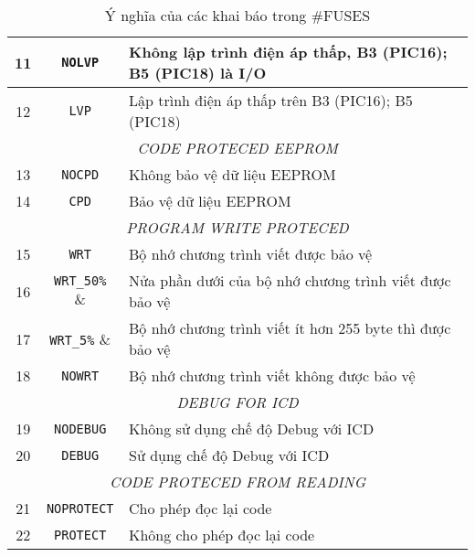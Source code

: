 \begin{table}[!h]
\begin{center}
\begin{longtable}{|c|c|c|c|}
11 & \verb|NOLVP| & \multicolumn{2}{|l|}{Không lập trình điện áp thấp, B3 (PIC16); B5 (PIC18) là I/O} \\ \hline
12 & \verb|LVP| & \multicolumn{2}{|l|}{Lập trình điện áp thấp trên B3 (PIC16); B5 (PIC18)} \\ \hline
\multicolumn{4}{|c|}{\textit{CODE PROTECED EEPROM}}\\ \hline
13 & \verb|NOCPD| & \multicolumn{2}{|l|}{Không bảo vệ dữ liệu EEPROM} \\ \hline
14 & \verb|CPD| & \multicolumn{2}{|l|}{Bảo vệ dữ liệu EEPROM} \\ \hline
\multicolumn{4}{|c|}{\textit{PROGRAM WRITE PROTECED}}\\ \hline
15 & \verb|WRT| & \multicolumn{2}{|l|}{Bộ nhớ chương trình viết được bảo vệ} \\ \hline
16 & \verb|WRT_50%| & \multicolumn{2}{|l|}{Nửa phần dưới của bộ nhớ chương trình viết được bảo vệ} \\ \hline
17 & \verb|WRT_5%| & \multicolumn{2}{|l|}{Bộ nhớ chương trình viết ít hơn 255 byte thì được bảo vệ} \\ \hline
18 & \verb|NOWRT| & \multicolumn{2}{|l|}{Bộ nhớ chương trình viết không được bảo vệ} \\ \hline
\multicolumn{4}{|c|}{\textit{DEBUG FOR ICD}}\\ \hline
19 & \verb|NODEBUG| & \multicolumn{2}{|l|}{Không sử dụng chế độ Debug với ICD} \\ \hline
20 & \verb|DEBUG| & \multicolumn{2}{|l|}{Sử dụng chế độ Debug với ICD} \\ \hline
\multicolumn{4}{|c|}{\textit{CODE PROTECED FROM READING}}\\ \hline
21 & \verb|NOPROTECT| & \multicolumn{2}{|l|}{Cho phép đọc lại code} \\ \hline
22 & \verb|PROTECT| & \multicolumn{2}{|l|}{Không cho phép đọc lại code} \\ \hline
\end{longtable}
\end{center}
\vspace{-.4cm}
\caption{Ý nghĩa của các khai báo trong \#FUSES}
\end{table}